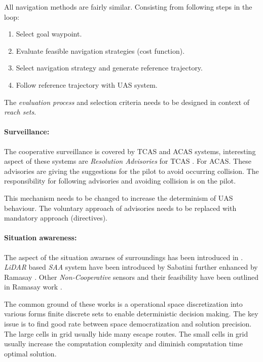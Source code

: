 All navigation methods are fairly similar. Consisting from following steps in the loop:
\begin{enumerate}
    \item Select goal waypoint.
    \item Evaluate feasible navigation strategies (cost function).
    
    \item Select navigation strategy and generate reference trajectory.
    
    \item Follow reference trajectory with UAS system.
\end{enumerate}
The \emph{evaluation process} and selection criteria needs to be designed in context of \emph{reach sets}.

\paragraph{Surveillance:} The cooperative surveillance is covered by TCAS and ACAS systems, interesting aspect of these systems are \emph{Resolution Advisories} \cite{kennedy1995resolution} for TCAS \cite{marston2015acas}. For ACAS.  These advisories are giving the suggestions for the pilot to avoid occurring collision. The responsibility for following advisories and avoiding collision is on the pilot.  

This mechanism needs to be changed to increase the determinism of UAS behaviour. The voluntary approach of advisories needs to be replaced with mandatory approach (directives).

\paragraph{Situation awareness:} The aspect of the situation awarnes of surroundings has been introduced in \cite{blaskovich2007declutter}. \emph{LiDAR} based \emph{SAA} system have been introduced by Sabatini \cite{sabatini2014lidar} further enhanced by Ramasay \cite{ramasamy2016lidar}. Other \emph{Non-Cooperative} sensors and their feasibility have been outlined in Ramasay work \cite{ramasamy2014avionics}. 

The common ground of these works is a operational space discretization into various forms finite discrete sets to enable deterministic decision making. The key issue is to find good rate between space democratization and solution precision. The large cells in grid usually hide many escape routes. The small cells in grid usually increase the computation complexity and diminish computation time optimal solution.

